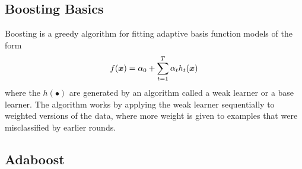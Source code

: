 \subsection{Boosting Basics}

Boosting is a greedy algorithm for fitting adaptive basis function models of the form
\begin{align*}
	f(\boldsymbol{x})=\alpha_0+\sum_{t=1}^T\alpha_th_t(\boldsymbol{x})
\end{align*}
where the $h(\bullet)$ are generated by an algorithm called a weak learner or a base learner. The algorithm works by applying the weak learner sequentially to weighted versions of the data, where more weight is given to examples that were misclassified by earlier rounds.

\subsection{Adaboost}

